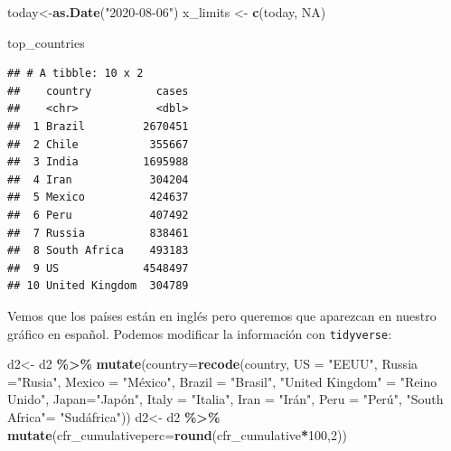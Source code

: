 \documentclass[
]{article}
\newenvironment{Shaded}{\begin{snugshade}}{\end{snugshade}}
\newcommand{\AttributeTok}[1]{\textcolor[rgb]{0.13,0.29,0.53}{#1}}
\newcommand{\ConstantTok}[1]{\textcolor[rgb]{0.56,0.35,0.01}{#1}}
\newcommand{\DecValTok}[1]{\textcolor[rgb]{0.00,0.00,0.81}{#1}}
\newcommand{\FunctionTok}[1]{\textcolor[rgb]{0.13,0.29,0.53}{\textbf{#1}}}
\newcommand{\NormalTok}[1]{#1}
\newcommand{\OtherTok}[1]{\textcolor[rgb]{0.56,0.35,0.01}{#1}}
\newcommand{\SpecialCharTok}[1]{\textcolor[rgb]{0.81,0.36,0.00}{\textbf{#1}}}
\newcommand{\StringTok}[1]{\textcolor[rgb]{0.31,0.60,0.02}{#1}}
\begin{document}
\begin{Shaded}
\begin{Highlighting}[]
\NormalTok{today}\OtherTok{\textless{}{-}}\FunctionTok{as.Date}\NormalTok{(}\StringTok{"2020{-}08{-}06"}\NormalTok{)}
\NormalTok{x\_limits }\OtherTok{\textless{}{-}} \FunctionTok{c}\NormalTok{(today, }\ConstantTok{NA}\NormalTok{)}

\NormalTok{top\_countries}
\end{Highlighting}
\end{Shaded}

\begin{verbatim}
## # A tibble: 10 x 2
##    country          cases
##    <chr>            <dbl>
##  1 Brazil         2670451
##  2 Chile           355667
##  3 India          1695988
##  4 Iran            304204
##  5 Mexico          424637
##  6 Peru            407492
##  7 Russia          838461
##  8 South Africa    493183
##  9 US             4548497
## 10 United Kingdom  304789
\end{verbatim}

Vemos que los países están en inglés pero queremos que aparezcan en
nuestro gráfico en español. Podemos modificar la información con
\texttt{tidyverse}:

\begin{Shaded}
\begin{Highlighting}[]
\NormalTok{d2}\OtherTok{\textless{}{-}}\NormalTok{ d2 }\SpecialCharTok{\%\textgreater{}\%}
  \FunctionTok{mutate}\NormalTok{(}\AttributeTok{country=}\FunctionTok{recode}\NormalTok{(country, }\AttributeTok{US =} \StringTok{"EEUU"}\NormalTok{, }\AttributeTok{Russia =}\StringTok{"Rusia"}\NormalTok{, }\AttributeTok{Mexico =} \StringTok{"México"}\NormalTok{, }\AttributeTok{Brazil =} \StringTok{"Brasil"}\NormalTok{, }
                        \StringTok{"United Kingdom"} \OtherTok{=} \StringTok{"Reino Unido"}\NormalTok{, }\AttributeTok{Japan=}\StringTok{"Japón"}\NormalTok{,}
                        \AttributeTok{Italy =} \StringTok{"Italia"}\NormalTok{, }\AttributeTok{Iran =} \StringTok{"Irán"}\NormalTok{, }\AttributeTok{Peru =} \StringTok{"Perú"}\NormalTok{,}
                        \StringTok{"South Africa"}\OtherTok{=} \StringTok{"Sudáfrica"}\NormalTok{))}
\NormalTok{d2}\OtherTok{\textless{}{-}}\NormalTok{ d2 }\SpecialCharTok{\%\textgreater{}\%}
  \FunctionTok{mutate}\NormalTok{(}\AttributeTok{cfr\_cumulativeperc=}\FunctionTok{round}\NormalTok{(cfr\_cumulative}\SpecialCharTok{*}\DecValTok{100}\NormalTok{,}\DecValTok{2}\NormalTok{))}
\end{Highlighting}
\end{Shaded}
\end{document}
